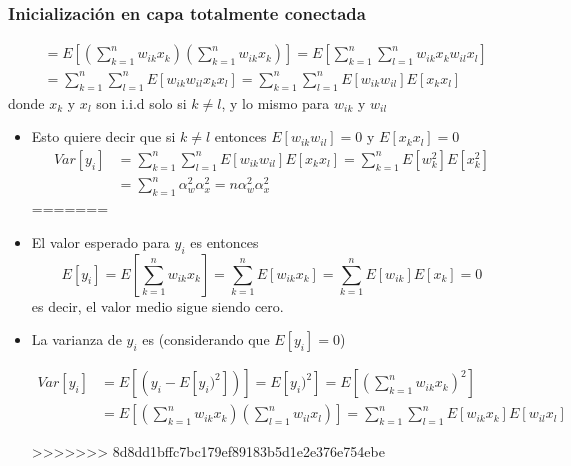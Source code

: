 \documentclass[svgnames,12pt,aspectratio=149]{beamer}
\begin{document}
\begin{frame}
  \frametitle{Inicialización en capa totalmente conectada}

  \begin{equation*}
  \begin{split}
  & = E\left[ \left(  \sum_{k=1}^n w_{ik} x_k \right) \left(  \sum_{k=1}^n w_{ik} x_k \right)  \right]=E\left[\sum_{k=1}^n \sum_{l=1}^n  w_{ik} x_k w_{il} x_l \right]\\
   &= \sum_{k=1}^n \sum_{l=1}^n E\left[w_{ik}  w_{il} x_k x_l \right] =\sum_{k=1}^n \sum_{l=1}^n E\left[w_{ik}w_{il} \right]E\left[  x_k x_l \right]
  \end{split}
 \end{equation*}
donde $x_k$ y $x_l$ son i.i.d solo si $k\neq l$, y lo mismo para $w_{ik}$ y $w_{il}$
\begin{itemize}
\item Esto quiere decir que si $k\neq l$ entonces $E[w_{ik}w_{il} ]=0$ y $E[x_k x_l ]=0$ 
\begin{equation*}
  \begin{split}
Var[y_i] & = \sum_{k=1}^n \sum_{l=1}^n E\left[w_{ik}w_{il} \right]E\left[  x_k x_l \right]=\sum_{k=1}^n E\left[w_{k}^2\right] E\left[  x_k^2\right]\\
& = \sum_{k=1}^n \alpha^2_w \alpha^2_x=n \alpha^2_w \alpha^2_x
\end{split}
\end{equation*}
=======
\item El valor esperado para $y_i$ es entonces 
\begin{equation*}
E\left[ y_{i}  \right] =E\left[ \sum_{k=1}^{n}{ w_{ik}x_{k} } \right]= \sum_{k=1}^{n}{ E\left[w_{ik}x_{k} \right]}=\sum_{k=1}^{n}{ E\left[w_{ik}\right]  E\left[x_{k} \right]}=0
\end{equation*}
es decir, el valor medio sigue siendo cero. 


\item La varianza de $y_i$ es (considerando que $E\left[ y_{i}  \right] =0$) 

\begin{equation*}
\begin{split}
Var\left[ y_{i} \right] & = E \left[ (y_{i}- E\left[ y_{i})^2 \right] )  \right]=E\left[ y_{i})^2\right]=E \left[ \left( \sum_{k=1}^{n}{ w_{ik}x_{k} }\right)^2   \right] \\
&=  E \left[ \left( \sum_{k=1}^{n}{ w_{ik}x_{k} }\right) \left( \sum_{l=1}^{n}{ w_{il}x_{l} }\right) \right]=   \sum_{k=1}^{n}\sum_{l=1}^{n} E \left[{ w_{ik}x_{k} } \right]  E \left[w_{il}x_{l}  \right]
\end{split}
\end{equation*}

>>>>>>> 8d8dd1bffc7bc179ef89183b5d1e2e376e754ebe
\end{itemize}
\end{frame}
\end{document}
